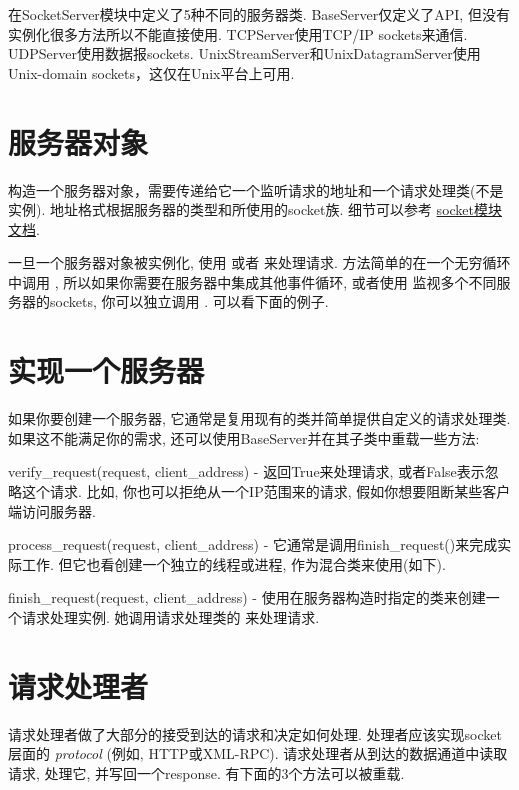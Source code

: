 \documentclass[a4paper,10pt,english]{manual}
\begin{document}
在SocketServer模块中定义了5种不同的服务器类. BaseServer仅定义了API, 但没有实例化很多方法所以不能直接使用. TCPServer使用TCP/IP sockets来通信. UDPServer使用数据报sockets. UnixStreamServer和UnixDatagramServer使用Unix-domain sockets，这仅在Unix平台上可用.


\section{服务器对象}

构造一个服务器对象，需要传递给它一个监听请求的地址和一个请求处理类(不是实例). 地址格式根据服务器的类型和所使用的socket族. 细节可以参考 \href{http://docs.python.org/lib/module-socket.html}{socket模块文档}.

一旦一个服务器对象被实例化, 使用  或者  来处理请求.  方法简单的在一个无穷循环中调用 , 所以如果你需要在服务器中集成其他事件循环, 或者使用  监视多个不同服务器的sockets, 你可以独立调用 . 可以看下面的例子.


\section{实现一个服务器}

如果你要创建一个服务器, 它通常是复用现有的类并简单提供自定义的请求处理类. 如果这不能满足你的需求, 还可以使用BaseServer并在其子类中重载一些方法:

verify\_request(request, client\_address) - 返回True来处理请求, 或者False表示忽略这个请求. 比如, 你也可以拒绝从一个IP范围来的请求, 假如你想要阻断某些客户端访问服务器.

process\_request(request, client\_address) - 它通常是调用finish\_request()来完成实际工作. 但它也看创建一个独立的线程或进程, 作为混合类来使用(如下).

finish\_request(request, client\_address) - 使用在服务器构造时指定的类来创建一个请求处理实例. 她调用请求处理类的  来处理请求.


\section{请求处理者}

请求处理者做了大部分的接受到达的请求和决定如何处理. 处理者应该实现socket层面的 \emph{protocol} (例如, HTTP或XML-RPC). 请求处理者从到达的数据通道中读取请求, 处理它, 并写回一个response. 有下面的3个方法可以被重载.
\end{document}
